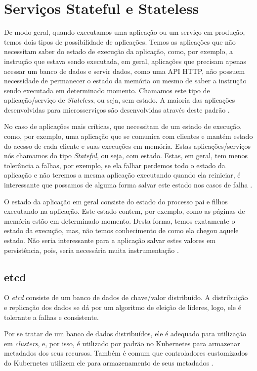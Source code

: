 \section{Serviços Stateful e Stateless}

De modo geral, quando executamos uma aplicação ou um serviço em produção,
temos dois tipos de possibilidade de aplicações. Temos as aplicações que
não necessitam saber do estado de execução da aplicação, como, por exemplo,
a instrução que estava sendo executada, em geral, aplicações que precisam
apenas acessar um banco de dados e servir dados, como uma API HTTP, não
possuem necessidade de permanecer o estado da memória ou mesmo de saber a
instrução sendo executada em determinado momento. Chamamos este tipo de
aplicação/serviço de \textit{Stateless}, ou seja, sem estado. A maioria das
aplicações desenvolvidas para microsserviços são desenvolvidas através
deste padrão \cite{vayghan2021kubernetes}.

No caso de aplicações mais críticas, que necessitam de um estado de execução,
como, por exemplo, uma aplicação que se comunica com clientes e mantém estado
do acesso de cada cliente e suas execuções em memória. Estas aplicações/serviços
nós chamamos do tipo \textit{Stateful}, ou seja, com estado. Estas, em geral,
tem menos tolerância a falhas, por exemplo, se ela falhar perdemos todo o estado
da aplicação e não teremos a mesma aplicação executando quando ela reiniciar,
é interessante que possamos de alguma forma salvar este estado nos casos de falha
\cite{vayghan2021kubernetes}.

O estado da aplicação em geral consiste do estado do processo pai e filhos
executando na aplicação. Este estado contem, por exemplo, como as páginas
de memória estão em determinado momento. Desta forma, temos exatamente o
estado da execução, mas, não temos conhecimento de como ela chegou aquele
estado. Não seria interessante para a aplicação salvar estes valores em
persistência, pois, seria necessária muita instrumentação \cite{oh2018stateful}.

\subsection{etcd}

O \textit{etcd} consiste de um banco de dados de chave/valor distribuído.
A distribuição e replicação dos dados se dá por um algoritmo de eleição de
líderes, logo, ele é tolerante a falhas e consistente. \cite{etcd}

Por se tratar de um banco de dados distribuídos, ele é adequado para
utilização em \textit{clusters}, e, por isso, é utilizado por padrão no
Kubernetes para armazenar metadados dos seus recursos. Também é comum que
controladores customizados do Kubernetes utilizem ele para armazenamento
de seus metadados \cite{kubernetes:etcd}.

